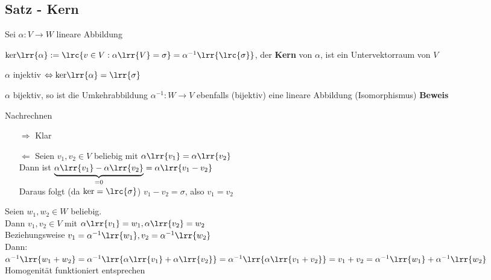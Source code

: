 \subsection{Satz - Kern}
	Sei $\alpha:V\rightarrow W$ lineare Abbildung
		\item $\mbox{ker}\lrr{\alpha}:=\lrc{v\in V:\alpha\lrr{V}=\sigma}=\alpha^{-1}\lrr{\lrc{\sigma}}$, der \textbf{Kern} von $\alpha$, ist ein Untervektorraum von $V$
		\item $\alpha$ injektiv $\Leftrightarrow\mbox{ker}\lrr{\alpha}=\lrr{\sigma}$
		\item $\alpha$ bijektiv, so ist die Umkehrabbildung $\alpha^{-1}:W\rightarrow V$ ebenfalls (bijektiv) eine lineare Abbildung (Isomorphismus)
	\subExEnd
	\textbf{Beweis}
		\item Nachrechnen
		\item
			\begin{enumerate}
				\item[$\Rightarrow$] Klar
				\item[$\Leftarrow$] Seien $v_1,v_2\in V$ beliebig mit $\alpha\lrr{v_1}=\alpha\lrr{v_2}$\\
					Dann ist $\underbrace{\alpha\lrr{v_1}-\alpha\lrr{v_2}}_{\scriptstyle =0}=\alpha\lrr{v_1-v_2}$\\
					Daraus folgt (da $\mbox{ker}=\lrc{\sigma}$) $v_1-v_2=\sigma$, also $v_1=v_2$
			\end{enumerate}
		\item Seien $w_1,w_2\in W$ beliebig.\\
			Dann $v_1,v_2\in V$ mit $\alpha\lrr{v_1}=w_1,\alpha\lrr{v_2}=w_2$\\
			Beziehungsweise $v_1=\alpha^{-1}\lrr{w_1}, v_2=\alpha^{-1}\lrr{w_2}$\\
			Dann:\\
			$\alpha^{-1}\lrr{w_1+w_2}=\alpha^{-1}\lrr{\alpha\lrr{v_1}+\alpha\lrr{v_2}}=\alpha^{-1}\lrr{\alpha\lrr{v_1+v_2}}=v_1+v_2=
			\alpha^{-1}\lrr{w_1}+\alpha^{-1}\lrr{w_2}$\\
			Homogenität funktioniert entsprechen
	\subExEnd

